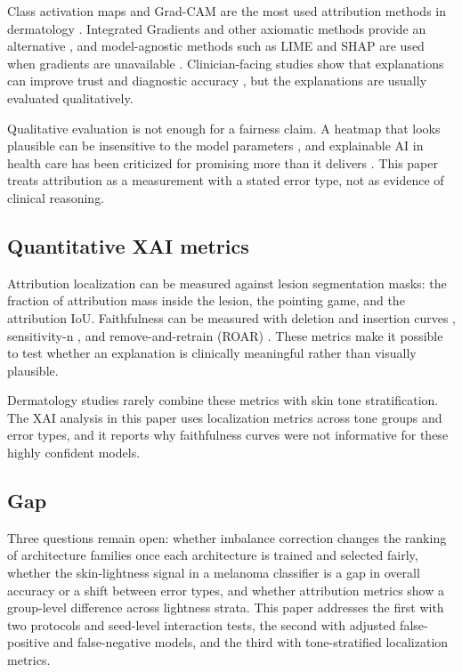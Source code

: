 Class activation maps and Grad-CAM are the most used attribution methods in dermatology \citep{zhou2016cam,selvaraju2017gradcam}. Integrated Gradients and other axiomatic methods provide an alternative \citep{sundararajan2017ig}, and model-agnostic methods such as LIME and SHAP are used when gradients are unavailable \citep{ribeiro2016lime,lundberg2017shap}. Clinician-facing studies show that explanations can improve trust and diagnostic accuracy \citep{chanda2024xai}, but the explanations are usually evaluated qualitatively.

Qualitative evaluation is not enough for a fairness claim. A heatmap that looks plausible can be insensitive to the model parameters \citep{adebayo2018sanity}, and explainable AI in health care has been criticized for promising more than it delivers \citep{ghassemi2021falsehope}. This paper treats attribution as a measurement with a stated error type, not as evidence of clinical reasoning.

\subsection{Quantitative XAI metrics}

Attribution localization can be measured against lesion segmentation masks: the fraction of attribution mass inside the lesion, the pointing game, and the attribution IoU. Faithfulness can be measured with deletion and insertion curves \citep{petsiuk2018rise}, sensitivity-n \citep{samek2017evaluating}, and remove-and-retrain (ROAR) \citep{hooker2019benchmark}. These metrics make it possible to test whether an explanation is clinically meaningful rather than visually plausible.

Dermatology studies rarely combine these metrics with skin tone stratification. The XAI analysis in this paper uses localization metrics across tone groups and error types, and it reports why faithfulness curves were not informative for these highly confident models.

\subsection{Gap}

Three questions remain open: whether imbalance correction changes the ranking of architecture families once each architecture is trained and selected fairly, whether the skin-lightness signal in a melanoma classifier is a gap in overall accuracy or a shift between error types, and whether attribution metrics show a group-level difference across lightness strata. This paper addresses the first with two protocols and seed-level interaction tests, the second with adjusted false-positive and false-negative models, and the third with tone-stratified localization metrics.
